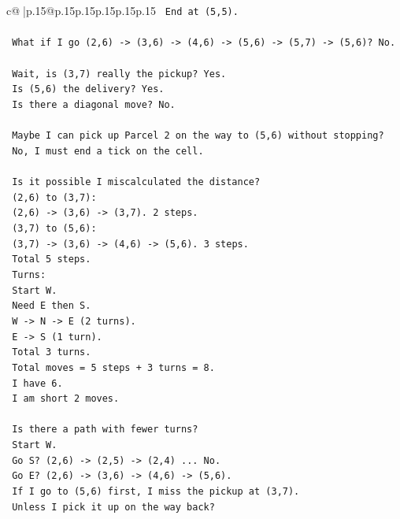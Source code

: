\documentclass{article}
\begin{document}
{\begin{supertabular}{c@{$\;$}|p{.15\linewidth}@{}p{.15\linewidth}p{.15\linewidth}p{.15\linewidth}p{.15\linewidth}p{.15\linewidth}}
{{{\texttt{   End at (5,5).} \\
\\ 
\texttt{   What if I go (2,6) {-}> (3,6) {-}> (4,6) {-}> (5,6) {-}> (5,7) {-}> (5,6)? No.} \\
\\ 
\texttt{   Wait, is (3,7) really the pickup? Yes.} \\
\texttt{   Is (5,6) the delivery? Yes.} \\
\texttt{   Is there a diagonal move? No.} \\
\\ 
\texttt{   Maybe I can pick up Parcel 2 on the way to (5,6) without stopping?} \\
\texttt{   No, I must end a tick on the cell.} \\
\\ 
\texttt{   Is it possible I miscalculated the distance?} \\
\texttt{   (2,6) to (3,7):} \\
\texttt{   (2,6) {-}> (3,6) {-}> (3,7). 2 steps.} \\
\texttt{   (3,7) to (5,6):} \\
\texttt{   (3,7) {-}> (3,6) {-}> (4,6) {-}> (5,6). 3 steps.} \\
\texttt{   Total 5 steps.} \\
\texttt{   Turns:} \\
\texttt{   Start W.} \\
\texttt{   Need E then S.} \\
\texttt{   W {-}> N {-}> E (2 turns).} \\
\texttt{   E {-}> S (1 turn).} \\
\texttt{   Total 3 turns.} \\
\texttt{   Total moves = 5 steps + 3 turns = 8.} \\
\texttt{   I have 6.} \\
\texttt{   I am short 2 moves.} \\
\\ 
\texttt{   Is there a path with fewer turns?} \\
\texttt{   Start W.} \\
\texttt{   Go S? (2,6) {-}> (2,5) {-}> (2,4) ... No.} \\
\texttt{   Go E? (2,6) {-}> (3,6) {-}> (4,6) {-}> (5,6).} \\
\texttt{   If I go to (5,6) first, I miss the pickup at (3,7).} \\
\texttt{   Unless I pick it up on the way back?} \\
}}}
\end{supertabular}}
\end{document}

